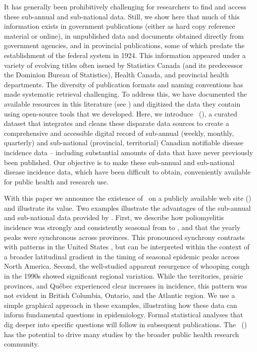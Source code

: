 \documentclass[12pt]{article}
\begin{document}
It has generally been prohibitively challenging for researchers to find and access these sub-annual and sub-national data. Still, we show here that much of this information exists in government publications (either as hard copy reference material or online), in unpublished data and documents obtained directly from government agencies, and in provincial publications, some of which predate the establishment of the federal system in 1924. This information appeared under a variety of evolving titles often issued by Statistics Canada (and its predecessor the Dominion Bureau of Statistics), Health Canada, and provincial health departments. The diversity of publication formats and naming conventions has made systematic retrieval challenging. To address this, we have documented the available resources in this literature (see ) and digitized the data they contain using open-source tools that we developed. Here, we introduce \datacronym\ (\datname), a curated dataset that integrates and cleans these disparate data sources to create a comprehensive and accessible digital record of sub-annual (weekly, monthly, quarterly) and sub-national (provincial, territorial) Canadian notifiable disease incidence data -- including substantial amounts of data that have never previously been published. Our objective is to make these sub-annual and sub-national disease incidence data, which have been difficult to obtain, conveniently available for public health and research use.

With this paper we announce the existence of \datacronym\ on a publicly available web site () and illustrate its value. Two examples illustrate the advantages of the sub-annual and sub-national data provided by \datacronym. First, we describe how poliomyelitis incidence was strongly and consistently seasonal from  to , and that the yearly peaks were synchronous across provinces. This pronounced synchrony contrasts with patterns in the United States \cite{martinez2015unraveling}, but can be interpreted within the context of a broader latitudinal gradient in the timing of seasonal epidemic peaks across North America. Second, the well-studied apparent resurgence of whooping cough in the 1990s showed significant regional variation. While the territories, prairie provinces, and Qu\'ebec experienced clear increases in incidence, this pattern was not evident in British Columbia, Ontario, and the Atlantic region. We use a simple graphical approach in these examples, illustrating how these data can inform fundamental questions in epidemiology. Formal statistical analyses that dig deeper into specific questions will follow in subsequent publications. The \datname\ (\datacronym) has the potential to drive many studies by the broader public health research community.
\end{document}
